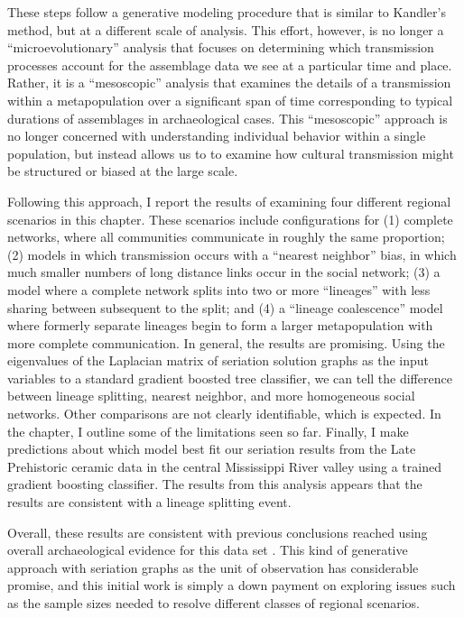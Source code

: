These steps follow a generative modeling procedure that is similar to Kandler’s \citeyearpar{Kandler20150905} method, but at a different scale of analysis. This effort, however, is no longer a “microevolutionary” analysis that focuses on determining which transmission processes account for the assemblage data we see at a particular time and place. Rather, it is a “mesoscopic” analysis that examines the details of a transmission within a metapopulation over a significant span of time corresponding to typical durations of assemblages in archaeological cases.  This “mesoscopic” approach is no longer concerned with understanding individual behavior within a single population, but instead allows us to to examine how cultural transmission might be structured or biased at the large scale.

Following this approach, I report the results of examining four different regional scenarios in this chapter. These scenarios include configurations for (1) complete networks, where all communities communicate in roughly the same proportion; (2) models in which  transmission occurs with a “nearest neighbor” bias, in which much smaller numbers of long distance links occur in the social network; (3) a model where a complete network splits into two or more “lineages” with less sharing between subsequent to the split; and  (4)  a “lineage coalescence” model where formerly separate lineages begin to form a larger metapopulation with more complete communication. In general, the results are promising. Using the eigenvalues of the Laplacian matrix of seriation solution graphs as the input variables to a standard gradient boosted tree classifier, we can tell the difference between lineage splitting, nearest neighbor, and more homogeneous social networks. Other comparisons are not clearly identifiable, which is expected. In the chapter, I outline some of the limitations seen so far. Finally, I make predictions about which model best fit our seriation results from the Late Prehistoric ceramic data in the central Mississippi River valley using a trained gradient boosting classifier.  The results from this analysis appears that the results are consistent with a lineage splitting event.

Overall, these results are consistent with previous conclusions reached using overall archaeological evidence for this data set \citep{Lipo2001}. This kind of generative approach with seriation graphs as the unit of observation has considerable promise, and this initial work is simply a down payment on exploring issues such as the sample sizes needed to resolve different classes of regional scenarios.



